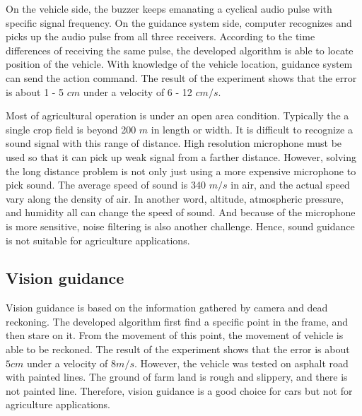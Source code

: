 \documentclass[letterpaper,12pt,oneside]{book}
\begin{document}
		On the vehicle side, the buzzer keeps emanating a cyclical audio pulse with specific signal frequency. On the guidance system side, computer recognizes and picks up the audio pulse from all three receivers. According to the time differences of receiving the same pulse, the developed algorithm is able to locate position of the vehicle. With knowledge of the vehicle location, guidance system can send the action command. The result of the experiment shows that the error is about 1 - 5 $cm$ under a velocity of 6 - 12 $cm/s$.\cite{yuping2011sound}
		
		Most of agricultural operation is under an open area condition. Typically the a single crop field is beyond 200 $m$ in length or width. It is difficult to recognize a sound signal with this range of distance.  High resolution microphone must be used so that it can pick up weak signal from a farther distance. However, solving the long distance problem is not only just using a more expensive microphone to pick sound. The average speed of sound is 340 $m/s$ in air, and the actual speed vary along the density of air. In another word, altitude, atmospheric pressure, and humidity all can change the speed of sound. And because of the microphone is more sensitive, noise filtering is also another challenge. Hence, sound guidance is not suitable for agriculture applications.
		
		\subsection{Vision guidance}
		Vision guidance is based on the information gathered by camera and dead reckoning. The developed algorithm first find a specific point in the frame, and then stare on it. From the movement of this point, the movement of vehicle is able to be reckoned. The result of the experiment shows that the error is about $5 cm$ under a velocity of $8 m/s$. \cite{jiang2006algorithm} However, the vehicle was tested on asphalt road with painted lines. The ground of farm land is rough and slippery, and there is not painted line. Therefore, vision guidance is a good choice for cars but not for agriculture applications.
		
\end{document}
